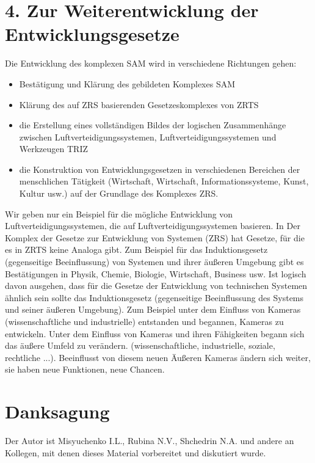 \documentclass[11pt,a4paper]{article}
\begin{document}
\section*{4. Zur Weiterentwicklung der Entwicklungsgesetze}
Die Entwicklung des komplexen SAM wird in verschiedene Richtungen gehen:
\begin{itemize}
  \item Bestätigung und Klärung des gebildeten Komplexes SAM
  \item Klärung des auf ZRS basierenden Gesetzeskomplexes von ZRTS
  \item die Erstellung eines vollständigen Bildes der logischen Zusammenhänge
    zwischen Luftverteidigungssystemen, Luftverteidigungssystemen und
    Werkzeugen TRIZ
  \item die Konstruktion von Entwicklungsgesetzen in verschiedenen Bereichen
    der menschlichen Tätigkeit (Wirtschaft, Wirtschaft, Informationssysteme,
    Kunst, Kultur usw.) auf der Grundlage des Komplexes ZRS.
\end{itemize}
Wir geben nur ein Beispiel für die mögliche Entwicklung von
Luftverteidigungssystemen, die auf Luftverteidigungssystemen basieren. In Der
Komplex der Gesetze zur Entwicklung von Systemen (ZRS) hat Gesetze, für die es
in ZRTS keine Analoga gibt.  Zum Beispiel für das Induktionsgesetz
(gegenseitige Beeinflussung) von Systemen und ihrer äußeren Umgebung gibt es
Bestätigungen in Physik, Chemie, Biologie, Wirtschaft, Business usw. Ist
logisch davon ausgehen, dass für die Gesetze der Entwicklung von technischen
Systemen ähnlich sein sollte das Induktionsgesetz (gegenseitige Beeinflussung
des Systems und seiner äußeren Umgebung). Zum Beispiel unter dem Einfluss von
Kameras (wissenschaftliche und industrielle) entstanden und begannen, Kameras
zu entwickeln.  Unter dem Einfluss von Kameras und ihren Fähigkeiten begann
sich das äußere Umfeld zu verändern.  (wissenschaftliche, industrielle,
soziale, rechtliche ...). Beeinflusst von diesem neuen Äußeren Kameras ändern
sich weiter, sie haben neue Funktionen, neue Chancen.

\section*{Danksagung}
Der Autor ist Misyuchenko I.L., Rubina N.V., Shchedrin N.A. und andere an
Kollegen, mit denen dieses Material vorbereitet und diskutiert wurde.
\end{document}
